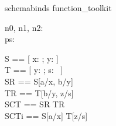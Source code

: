 \begin{zsection}
\SECTION schemabinds \parents function\_toolkit
\end{zsection}

\begin{axdef}
   n0, n1, n2: \nat
\\
   ps: \power~\nat
\end{axdef}

\begin{zed}
   S == [ x: \nat; y: \nat ] 
\\
   T == [ y: \nat; s: \power~\nat ]
\\
   SR == S[a/x, b/y]
\\
   TR == T[b/y, z/s]
\\
   SCT == SR \semi TR 
\\
   SCTi == S[a/x] \semi T[z/s]
\end{zed}